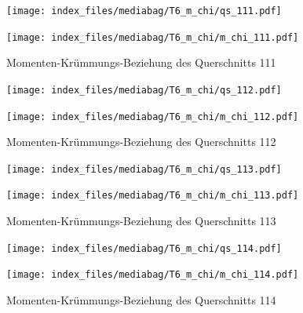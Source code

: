 \documentclass[
  11pt,
  letterpaper,
]{scrreprt}
\begin{document}
\begin{figure}[H]

\begin{minipage}{0.50\linewidth}
\texttt{[image: index\_files/mediabag/T6\_m\_chi/qs\_111.pdf]}\end{minipage}%
%
\begin{minipage}{0.50\linewidth}
\texttt{[image: index\_files/mediabag/T6\_m\_chi/m\_chi\_111.pdf]}\end{minipage}%

\caption{\label{fig-mchi_anhang}Momenten-Krümmungs-Beziehung des
Querschnitts 111}

\end{figure}%

\begin{figure}[H]

\begin{minipage}{0.50\linewidth}
\texttt{[image: index\_files/mediabag/T6\_m\_chi/qs\_112.pdf]}\end{minipage}%
%
\begin{minipage}{0.50\linewidth}
\texttt{[image: index\_files/mediabag/T6\_m\_chi/m\_chi\_112.pdf]}\end{minipage}%

\caption{\label{fig-mchi_anhang}Momenten-Krümmungs-Beziehung des
Querschnitts 112}

\end{figure}%

\begin{figure}[H]

\begin{minipage}{0.50\linewidth}
\texttt{[image: index\_files/mediabag/T6\_m\_chi/qs\_113.pdf]}\end{minipage}%
%
\begin{minipage}{0.50\linewidth}
\texttt{[image: index\_files/mediabag/T6\_m\_chi/m\_chi\_113.pdf]}\end{minipage}%

\caption{\label{fig-mchi_anhang}Momenten-Krümmungs-Beziehung des
Querschnitts 113}

\end{figure}%

\begin{figure}[H]

\begin{minipage}{0.50\linewidth}
\texttt{[image: index\_files/mediabag/T6\_m\_chi/qs\_114.pdf]}\end{minipage}%
%
\begin{minipage}{0.50\linewidth}
\texttt{[image: index\_files/mediabag/T6\_m\_chi/m\_chi\_114.pdf]}\end{minipage}%

\caption{\label{fig-mchi_anhang}Momenten-Krümmungs-Beziehung des
Querschnitts 114}

\end{figure}%
\end{document}
